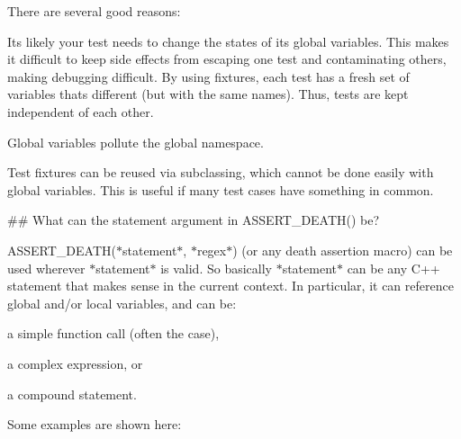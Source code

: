 There are several good reasons\+:


\begin{DoxyEnumerate}
\item It\textquotesingle{}s likely your test needs to change the states of its global variables. This makes it difficult to keep side effects from escaping one test and contaminating others, making debugging difficult. By using fixtures, each test has a fresh set of variables that\textquotesingle{}s different (but with the same names). Thus, tests are kept independent of each other.
\end{DoxyEnumerate}
\begin{DoxyEnumerate}
\item Global variables pollute the global namespace.
\end{DoxyEnumerate}
\begin{DoxyEnumerate}
\item Test fixtures can be reused via subclassing, which cannot be done easily with global variables. This is useful if many test cases have something in common.
\end{DoxyEnumerate}

\begin{DoxyVerb}## What can the statement argument in ASSERT_DEATH() be?
\end{DoxyVerb}


{\ttfamily A\+S\+S\+E\+R\+T\+\_\+\+D\+E\+A\+T\+H($\ast$statement$\ast$, $\ast$regex$\ast$)} (or any death assertion macro) can be used wherever {\ttfamily $\ast$statement$\ast$} is valid. So basically {\ttfamily $\ast$statement$\ast$} can be any C++ statement that makes sense in the current context. In particular, it can reference global and/or local variables, and can be\+:


\begin{DoxyItemize}
\item a simple function call (often the case),
\item a complex expression, or
\item a compound statement.
\end{DoxyItemize}

Some examples are shown here\+:


